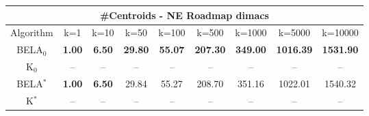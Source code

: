 \begin{tabular}{c|cccccccc}\toprule
\multicolumn{9}{c}{#Centroids - NE Roadmap dimacs}\\ \midrule
Algorithm & k=1 & k=10 & k=50 & k=100 & k=500 & k=1000 & k=5000 & k=10000 \\ \midrule
BELA$_0$ & \textbf{1.00} & \textbf{6.50} & \textbf{29.80} & \textbf{55.07} & \textbf{207.30} & \textbf{349.00} & \textbf{1016.39} & \textbf{1531.90} \\
K$_0$ & -- & -- & -- & -- & -- & -- & -- & -- \\
BELA$^*$ & \textbf{1.00} & \textbf{6.50} & 29.84 & 55.27 & 208.70 & 351.16 & 1022.01 & 1540.32 \\
K$^*$ & -- & -- & -- & -- & -- & -- & -- & -- \\ \bottomrule 
\end{tabular}
